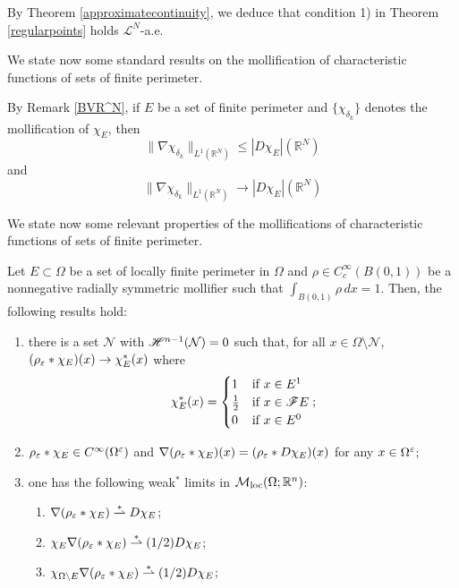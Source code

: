 \begin{remark} By Theorem \ref{approximatecontinuity}, we deduce that condition 1) in Theorem \ref{regularpoints} holds $\mathcal{L}^{N}$-a.e. 
\end{remark}

We state now some standard results on the mollification of characteristic functions of sets of finite perimeter.

\begin{remark} \label{chargradbound} By Remark \ref{BVR^N}, if $E$ be a set of finite perimeter and $\{ \chi_{\delta_{k}} \}$ denotes the mollification of $\chi_{E}$, then
\[ \|\nabla \chi_{\delta_{k}}\|_{L^{1}(\mathbb{R}^{N})} \le |D \chi_{E}|(\mathbb{R}^{N}) \]
and
\[ \|\nabla \chi_{\delta_{k}}\|_{L^{1}(\mathbb{R}^{N})} \to |D \chi_{E}|(\mathbb{R}^{N}) \]
\end{remark}

We state now some relevant properties of the mollifications of characteristic functions of sets of finite perimeter.

\begin{lemma} \label{mollcharconv} Let $E \subset \Omega$ be a set of locally finite perimeter in $\Omega$ and $\rho \in C^{\infty}_{c}(B(0, 1))$ be a nonnegative radially symmetric mollifier such that $\int_{B(0, 1)} \rho \, dx = 1$. Then, the following results hold:
\begin{enumerate}
	\item there is a set $\mathcal{N}$ with $\mathscr{H}^{n - 1}(\mathcal{N}) = 0$ such that, for all $x \in \Omega \setminus \mathcal{N}$, $(\rho_{\varepsilon} \ast \chi_{E})(x) \to \chi_{E}^{*}(x)$ where
\begin{equation}\label{PRChi}
 \chi_{E}^{*}(x) = \begin{cases} 1  &  \mbox{if} \ x \in E^{1} \\ \frac{1}{2} &  \mbox{if} \ x \in \mathscr{F} E \\ 0 &  \mbox{if} \ x \in E^{0} \end{cases} ;
\end{equation}
\item $\rho_{\varepsilon} \ast \chi_{E} \in C^{\infty}(\Omega^{\varepsilon})$ and $\nabla (\rho_{\varepsilon} \ast \chi_{E})(x) = (\rho_{\varepsilon} \ast D \chi_{E})(x)$ for any $x \in \Omega^{\varepsilon}$;
\item one has the following weak$^*$ limits in $\mathcal{M}_{\rm loc}(\Omega; \mathbb{R}^{n})$:
\begin{enumerate}
		\item $\nabla (\rho_{\varepsilon} \ast \chi_{E}) \overset{*}{\rightharpoonup} D\chi_{E}$;
		\item $\chi_{E} \nabla (\rho_{\varepsilon} \ast \chi_{E}) \overset{*}{\rightharpoonup} (1/2) D \chi_{E}$;
		\item $\chi_{\Omega \setminus E} \nabla (\rho_{\varepsilon} \ast \chi_{E}) \overset{*}{\rightharpoonup} (1/2) D \chi_{E}$;
\end{enumerate}
\end{enumerate}
\end{lemma}




